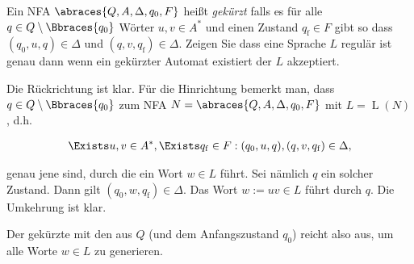 
\begin{exercise}

Ein NFA $\abraces{Q, A, \Delta, q_0, F}$ heißt \textit{gekürzt} falls es für alle $q \in Q \setminus \Bbraces{q_0}$ Wörter $u, v \in A^\ast$ und einen Zustand $q_\mathrm{f} \in F$ gibt so dass $(q_0, u, q) \in \Delta$ und $(q, v, q_\mathrm{f}) \in \Delta$.
Zeigen Sie dass eine Sprache $L$ regulär ist genau dann wenn ein gekürzter Automat existiert der $L$ akzeptiert.

\end{exercise}


\begin{solution}

Die Rückrichtung ist klar.
Für die Hinrichtung bemerkt man, dass  $q \in Q \setminus \Bbraces{q_0}$ zum NFA $N = \abraces{Q, A, \Delta, q_0, F}$ mit $L = \operatorname L(N)$, d.h.

\begin{align*}
    \Exists u, v \in A^\ast, \Exists q_\mathrm{f} \in F:
        (q_0, u, q), (q, v, q_\mathrm{f}) \in \Delta,
\end{align*}

genau jene sind, durch die ein Wort $w \in L$ führt.
Sei nämlich $q$ ein solcher Zustand.
Dann gilt $(q_0, w, q_\mathrm{f}) \in \Delta$.
Das Wort $w := uv \in L$ führt durch $q$.
Die Umkehrung ist klar.

Der gekürzte  mit den  aus $Q$ (und dem Anfangszustand $q_0$) reicht also aus, um alle Worte $w \in L$ zu generieren.

\end{solution}


